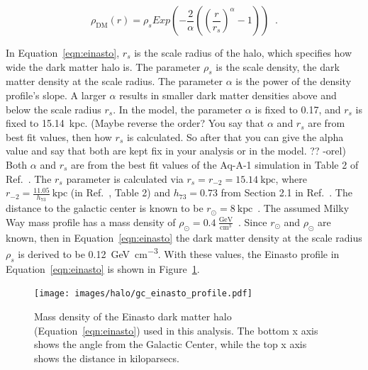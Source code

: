     \begin{equation} \label{eqn:einasto}
      \rho_{\textrm{DM}} \left( r \right) = \rho_{s} Exp \left( - \frac{2}{\alpha} \left( {\left( \frac{r}{r_s} \right)}^{\alpha} - 1 \right) \right) \;\; .
    \end{equation}
    
    
    In Equation~\ref{eqn:einasto}, $r_s$ is the scale radius of the halo, which specifies how wide the dark matter halo is.
    The parameter $\rho_s$ is the scale density, the dark matter density at the scale radius.
    The parameter $\alpha$ is the power of the density profile's slope.
    A larger $\alpha$ results in smaller dark matter densities above and below the scale radius $r_s$.
    In the model, the parameter $\alpha$ is fixed to 0.17, and $r_s$ is fixed to \SI{15.14}{kpc}.
    {\color{red}(Maybe reverse the order? You say that $\alpha$ and $r_s$ are from best fit values, then how $r_s$ is calculated. So after that you can give the alpha value and say that both are kept fix in your analysis or in the model. ?? -orel)}
    Both $\alpha$ and $r_s$ are from the best fit values of the Aq-A-1 simulation in Table 2 of Ref.~\cite{mw_halo_params}.
    The $r_s$ parameter is calculated via $r_s=r_{-2}=15.14\:\textrm{kpc}$, where $r_{-2}=\frac{11.05}{h_{73}}\:\textrm{kpc}$ (in Ref.~\cite{mw_halo_params}, Table 2) and $h_{73}=0.73$ from Section 2.1 in Ref.~\cite{mw_halo_params}.
    The distance to the galactic center is known to be $r_\odot=8\:\textrm{kpc}$~\cite{gc_distance_1,gc_distance_2,gc_distance_3}.
    The assumed Milky Way mass profile has a mass density of $\rho_\odot = 0.4\:\frac{\textrm{GeV}}{\textrm{cm}^3}$~\cite{local_dm_density,direct_dm_astrophysical_uncertainties}.
    Since $r_\odot$ and $\rho_\odot$ are known, then in Equation~\ref{eqn:einasto} the dark matter density at the scale radius $\rho_s$ is derived to be \SI{0.12}{\GeV\per\cm^3}.
    With these values, the Einasto profile in Equation~\ref{eqn:einasto} is shown in Figure~\ref{fig:gchalo_density}.
  
    \begin{figure}[ht]
      \centering
      \texttt{[image: images/halo/gc\_einasto\_profile.pdf]}
      \caption[Galactic Center Einasto Halo Density]{
        Mass density of the Einasto dark matter halo (Equation~\ref{eqn:einasto}) used in this analysis.
        The bottom x axis shows the angle from the Galactic Center, while the top x axis shows the distance in kiloparsecs.
        \CaptionBlankLine
        }
      \label{fig:gchalo_density}
    \end{figure}

